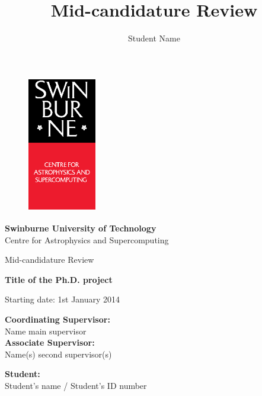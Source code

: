 \documentclass[useAMS,usenatbib,onecolumn]{mnras}
\title{Mid-candidature Review}
\author[Student Name]
 {Student Name}
\begin{document}
\fontsize{11}{12.5}\selectfont
\begin{center}

\begin{figure}
\begin{center}
\includegraphics[height=6cm,width=3cm]{./astro_v.eps}
\end{center}
\end{figure}

{\bf \LARGE S\Large winburne \LARGE U\Large niversity of  \LARGE T\Large echnology\\
\vspace{0.5cm}}
\LARGE C\Large entre for \LARGE A\Large strophysics and \LARGE S\Large upercomputing\\
\vspace{0.5cm}

\large Mid-candidature Review\\
\vspace{0.5cm}



\Huge{\bf Title of the Ph.D. project}

\vspace{3cm}
\large{Starting date: 1st January 2014}
\end{center}


\begin{flushleft}
{\bf Coordinating Supervisor:}\\
Name main supervisor\\
\vspace{0.5cm}
{\bf Associate Supervisor:}\\
Name(s) second supervisor(s)\\
\end{flushleft}

\begin{flushright}
{\bf Student:}\\
Student's name / Student's ID number
\end{flushright}\hspace{8cm}
\end{document}
